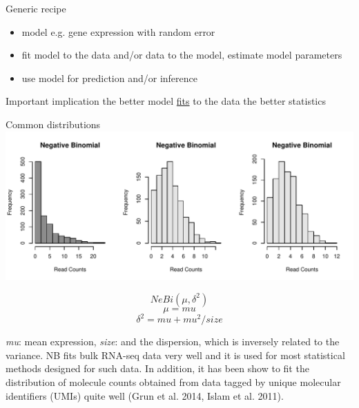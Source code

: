 \documentclass{beamer}\usepackage[]{graphicx}\usepackage[]{color}
\makeatletter
\def\maxwidth{ %
  \ifdim\Gin@nat@width>\linewidth
    \linewidth
  \else
    \Gin@nat@width
  \fi
}
\newenvironment{knitrout}{}{} %
\makeatother
\begin{document}
\begin{frame}
\begin{block}{Generic recipe}
\begin{itemize}
\item model e.g. gene expression with random error
\item fit model to the data and/or data to the model, estimate model parameters
\item use model for prediction and/or inference
\end{itemize}
\end{block}
\vspace{0.5cm}

\begin{block}{Important implication}
the better model \href{http://www.itl.nist.gov/div898/handbook/pmd/section4/pmd44.htm}{fits} to the data the better statistics
\end{block}
\end{frame}


\begin{frame}
\begin{block}{Common distributions}
\begin{knitrout}
\color{fgcolor}
\includegraphics[width=\maxwidth]{figure/dist-NB-1} 

\end{knitrout}
\tiny
$$NeBi(\mu, \delta^2)$$
$$\mu=mu$$
$$\delta^2=mu+mu^2/size$$

\textit{mu}: mean expression, \textit{size}: and the dispersion, which is inversely related to the variance. NB fits bulk RNA-seq data very well and it is used for most statistical methods designed for such data. In addition, it has been show to fit the distribution of molecule counts obtained from data tagged by unique molecular identifiers (UMIs) quite well (Grun et al. 2014, Islam et al. 2011).

\end{block}
\end{frame}
\end{document}
